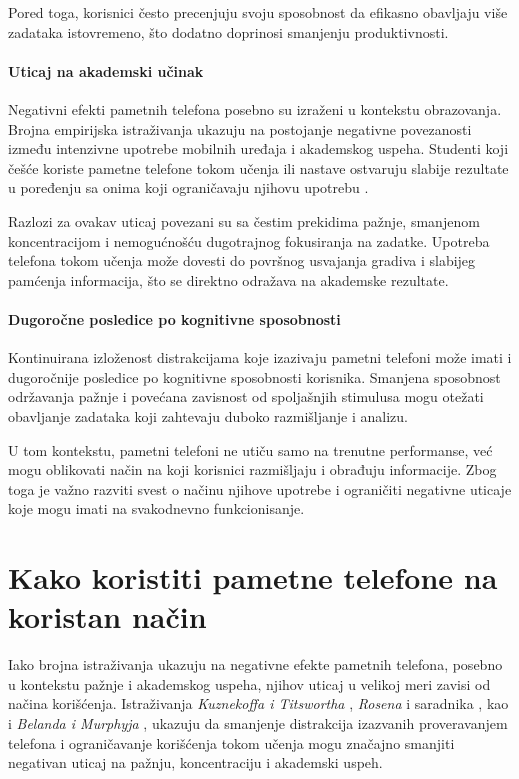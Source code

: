 \documentclass{article}
\begin{document}
Pored toga, korisnici često precenjuju svoju sposobnost da efikasno obavljaju više zadataka istovremeno, što dodatno doprinosi smanjenju produktivnosti.

\paragraph{Uticaj na akademski učinak}

Negativni efekti pametnih telefona posebno su izraženi u kontekstu obrazovanja. 
Brojna empirijska istraživanja ukazuju na postojanje negativne povezanosti između intenzivne upotrebe mobilnih uređaja i akademskog uspeha. 
Studenti koji češće koriste pametne telefone tokom učenja ili nastave ostvaruju slabije rezultate u poređenju sa onima koji ograničavaju njihovu upotrebu \cite{Kuznekoff2013, Rosen2013, Beland2016}.

Razlozi za ovakav uticaj povezani su sa čestim prekidima pažnje, smanjenom koncentracijom i nemogućnošću dugotrajnog fokusiranja na zadatke. 
Upotreba telefona tokom učenja može dovesti do površnog usvajanja gradiva i slabijeg pamćenja informacija, što se direktno odražava na akademske rezultate.

\paragraph{Dugoročne posledice po kognitivne sposobnosti}

Kontinuirana izloženost distrakcijama koje izazivaju pametni telefoni može imati i dugoročnije posledice po kognitivne sposobnosti korisnika. Smanjena sposobnost održavanja pažnje i povećana zavisnost od spoljašnjih stimulusa mogu otežati obavljanje zadataka koji zahtevaju duboko razmišljanje i analizu.

U tom kontekstu, pametni telefoni ne utiču samo na trenutne performanse, već mogu oblikovati način na koji korisnici razmišljaju i obrađuju informacije. Zbog toga je važno razviti svest o načinu njihove upotrebe i ograničiti negativne uticaje koje mogu imati na svakodnevno funkcionisanje.

\section{Kako koristiti pametne telefone na koristan način}

Iako brojna istraživanja ukazuju na negativne efekte pametnih telefona, posebno u kontekstu pažnje i akademskog uspeha, njihov uticaj u velikoj meri zavisi od načina korišćenja. Istraživanja \textit{Kuznekoffa i Titswortha} \cite{Kuznekoff2013}, \textit{Rosena} i saradnika \cite{Rosen2013}, kao i \textit{Belanda i Murphyja} \cite{Beland2016}, ukazuju da smanjenje distrakcija izazvanih proveravanjem telefona i ograničavanje korišćenja tokom učenja mogu značajno smanjiti negativan uticaj na pažnju, koncentraciju i akademski uspeh.
\end{document}
